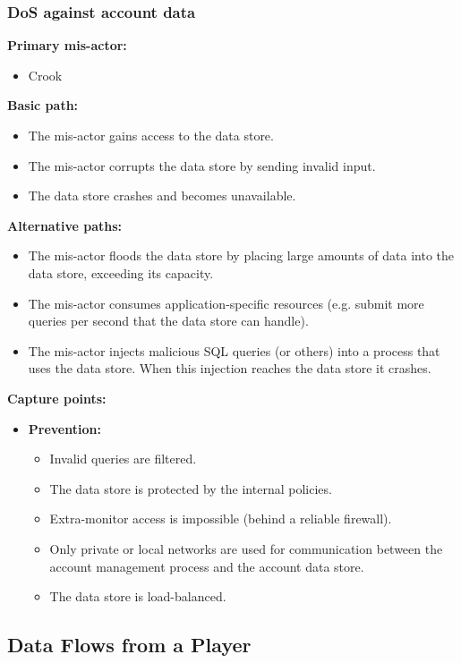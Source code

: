 \documentclass[a4paper,11pt]{report}
\begin{document}
\subsubsection{DoS against account data}
\label{AccountDataCasesD}
\textbf{Primary mis-actor:}
\begin{itemize}
\item Crook
\end{itemize}
\textbf{Basic path:}
\begin{itemize}
\item The mis-actor gains access to the data store.
\item The mis-actor corrupts the data store by sending invalid input.
\item The data store crashes and becomes unavailable.
\end{itemize}
\textbf{Alternative paths:}
\begin{itemize}
\item The mis-actor floods the data store by placing large amounts of data into the data store, exceeding its capacity.
\item The mis-actor consumes application-specific resources (e.g. submit more queries per second that the data
store can handle).
\item The mis-actor injects malicious SQL queries (or others) into a process that uses the data store. When this injection reaches the data store it crashes.
\end{itemize}
\textbf{Capture points:}
\begin{itemize}
\item \textbf{Prevention:}
\begin{itemize}
\item Invalid queries are filtered.
\item The data store is protected by the internal policies.
\item Extra-monitor access is impossible (behind a reliable firewall).
\item Only private or local networks are used for communication between the account management process
and the account data store.
\item The data store is load-balanced.
\end{itemize}
\end{itemize}

\subsection{Data Flows from a Player}
\label{PlayerFlowCases}
\end{document}
